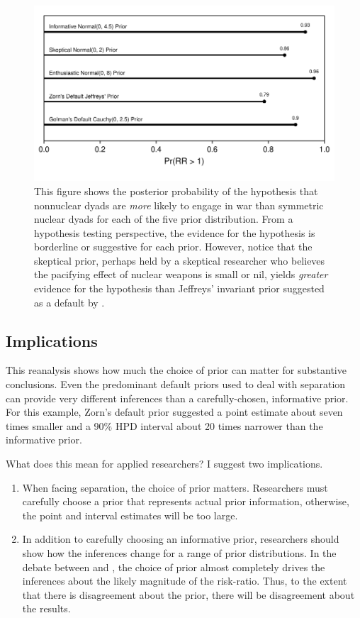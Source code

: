 \documentclass[12pt]{article}
\begin{document}
\begin{figure}[H]
\begin{center}
\includegraphics[scale = .8]{figs/bm-pr-hypothesis.pdf}
\caption{This figure shows the posterior probability of the hypothesis that nonnuclear dyads are \emph{more} likely to engage in war than symmetric nuclear dyads for each of the five prior distribution. From a hypothesis testing perspective, the evidence for the hypothesis is borderline or suggestive for each prior. However, notice that the skeptical prior, perhaps held by a skeptical researcher who believes the pacifying effect of nuclear weapons is small or nil, yields \emph{greater} evidence for the hypothesis than Jeffreys' invariant prior suggested as a default by \cite{Zorn2005}.}\label{fig:bm-pr-hypothesis}
\end{center}
\end{figure}

\subsection*{Implications}

This reanalysis shows how much the choice of prior can matter for substantive conclusions. Even the predominant default priors used to deal with separation can provide very different inferences than a carefully-chosen, informative prior. For this example, Zorn's default prior suggested a point estimate about seven times smaller and a 90\% HPD interval about 20 times narrower than the informative prior.

What does this mean for applied researchers? I suggest two implications.
\begin{enumerate}
\item When facing separation, the choice of prior matters. Researchers must carefully choose a prior that represents actual prior information, otherwise, the point and interval estimates will be too large.
\item In addition to carefully choosing an informative prior, researchers should show how the inferences change for a range of prior distributions. In the debate between \cite{BellMiller2014} and \cite{Rauchhaus2009}, the choice of prior almost completely drives the inferences about the likely magnitude of the risk-ratio. Thus, to the extent that there is disagreement about the prior, there will be disagreement about the results.
\end{enumerate}
\end{document}
